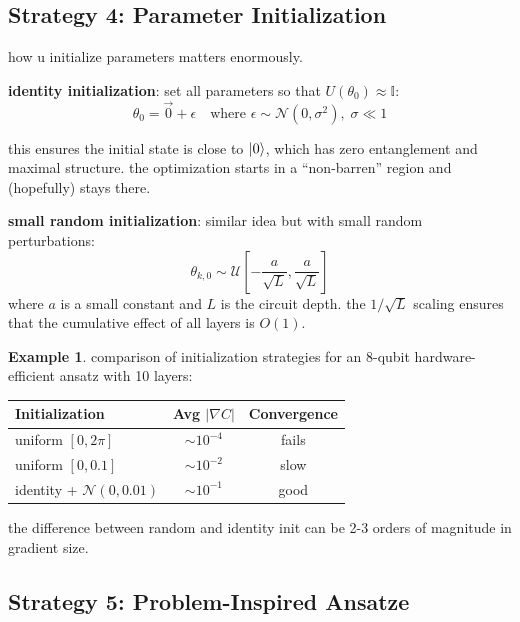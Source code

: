 \documentclass[11pt,a4paper]{article}
\theoremstyle{definition}
\newtheorem{example}{Example}[section]
\theoremstyle{remark}
\begin{document}
\subsection{Strategy 4: Parameter Initialization}

how u initialize parameters matters enormously.

\textbf{identity initialization}: set all parameters so that $U(\theta_0) \approx \mathbb{I}$:
\begin{equation}
    \theta_0 = \vec{0} + \epsilon \quad \text{where } \epsilon \sim \mathcal{N}(0, \sigma^2), \; \sigma \ll 1
\end{equation}

this ensures the initial state is close to $\ket{0}$, which has zero entanglement and maximal structure. the optimization starts in a ``non-barren'' region and (hopefully) stays there.

\textbf{small random initialization}: similar idea but with small random perturbations:
\begin{equation}
    \theta_{k,0} \sim \mathcal{U}\left[-\frac{a}{\sqrt{L}}, \frac{a}{\sqrt{L}}\right]
\end{equation}
where $a$ is a small constant and $L$ is the circuit depth. the $1/\sqrt{L}$ scaling ensures that the cumulative effect of all layers is $O(1)$.

\begin{example}
comparison of initialization strategies for an 8-qubit hardware-efficient ansatz with 10 layers:
\begin{center}
\renewcommand{\arraystretch}{1.3}
\begin{tabular}{|l|c|c|}
\hline
\textbf{Initialization} & \textbf{Avg $|\nabla C|$} & \textbf{Convergence} \\
\hline
uniform $[0, 2\pi]$ & $\sim 10^{-4}$ & fails \\
\hline
uniform $[0, 0.1]$ & $\sim 10^{-2}$ & slow \\
\hline
identity + $\mathcal{N}(0, 0.01)$ & $\sim 10^{-1}$ & good \\
\hline
\end{tabular}
\end{center}
the difference between random and identity init can be 2-3 orders of magnitude in gradient size.
\end{example}

\subsection{Strategy 5: Problem-Inspired Ansatze}
\end{document}
